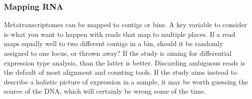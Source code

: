 \subsubsection{Mapping RNA}
Metatranscriptomes can be mapped to contigs or bins.
A key variable to consider is what you want to happen with reads that map to multiple places.
If a read maps equally well to two different contigs in a bin, should it be randomly assigned to one locus, or thrown away?
If the study is aiming for differential expression type analysis, than the latter is better.
Discarding ambiguous reads is the default of most alignment and counting tools.
If the study aims instead to describe a holistic picture of expression in a sample, it may be worth guessing the source of the DNA, which will certainly be wrong some of the time.


